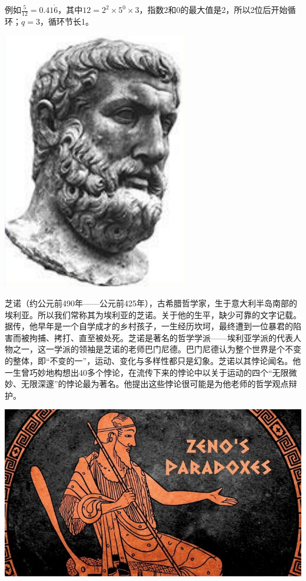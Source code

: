 \documentclass[b5paper]{ctexart}
\begin{document}
例如$\frac{5}{12} = 0.41\dot{6}$，其中$12 = 2^2 \times 5^0 \times 3$，指数2和0的最大值是2，所以2位后开始循环；$q = 3$，循环节长1。

\begin{mdframed}

\begin{center}
 \includegraphics[scale=0.3]{img/zeno}
 \label{fig:Zeno-of-Elea}
\end{center}

芝诺（约公元前490年——公元前425年），古希腊哲学家，生于意大利半岛南部的埃利亚。所以我们常称其为埃利亚的芝诺。关于他的生平，缺少可靠的文字记载。据传，他早年是一个自学成才的乡村孩子，一生经历坎坷，最终遭到一位暴君的陷害而被拘捕、拷打、直至被处死\cite{HanXueTao16}。芝诺是著名的哲学学派——埃利亚学派的代表人物之一，这一学派的领袖是芝诺的老师巴门尼德。巴门尼德认为整个世界是个不变的整体，即“不变的一”，运动、变化与多样性都只是幻象。芝诺以其悖论闻名。他一生曾巧妙地构想出40多个悖论，在流传下来的悖论中以关于运动的四个“无限微妙、无限深邃”的悖论最为著名。他提出这些悖论很可能是为他老师的哲学观点辩护。

\begin{center}
 \includegraphics[scale=0.3]{img/zeno-paradox}
 \label{fig:Zeno-paradox}
\end{center}


\end{mdframed}
\end{document}
